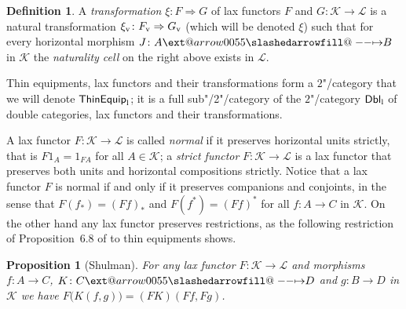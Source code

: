 \documentclass[preprint, a4paper]{elsarticle}
\makeatletter
\def\slashedarrowfill@#1#2#3#4#5{%
  $\m@th\thickmuskip0mu\medmuskip\thickmuskip\thinmuskip\thickmuskip
   \relax#5#1\mkern-7mu%
   \cleaders\hbox{$#5\mkern-2mu#2\mkern-2mu$}\hfill
   \mathclap{#3}\mathclap{#2}%
   \cleaders\hbox{$#5\mkern-2mu#2\mkern-2mu$}\hfill
   \mkern-7mu#4$%
}
\def\rightslashedarrowfill@{%
  \slashedarrowfill@\relbar\relbar\mapstochar\rightarrow}
\newcommand\xslashedrightarrow[2][]{%
  \ext@arrow 0055{\rightslashedarrowfill@}{#1}{#2}}
\def\slashedrightarrow{\xslashedrightarrow{}}
\newtheorem{proposition}[theorem]{Proposition}
\theoremstyle{definition}
\newtheorem{definition}[theorem]{Definition}
\theoremstyle{remark}
\providecommand{\bigpars}[1]{\bigl(#1\bigr)}
\providecommand{\natarrow}{\Rightarrow}
\providecommand{\map}[3]{#1\colon#2\to#3}
\providecommand{\nat}[3]{#1\colon#2\natarrow#3}
\providecommand{\hmap}[3]{#1\colon#2\slashedrightarrow#3}
\providecommand{\catvar}[1]{\mathcal{#1}}
\providecommand{\Dbl}{\mathsf{Dbl}}
\providecommand{\2}{\mathsf 2}
\providecommand{\K}{\catvar K}
\providecommand{\Dbl}{\mathsf{Dbl}}
\providecommand{\lDbl}{\Dbl_\textup l}
\providecommand{\ThinEq}{\mathsf{ThinEquip}}
\providecommand{\lThinEq}{\ThinEq_\textup l}
\makeatother
\begin{document}
\begin{definition}
  	A \emph{transformation} $\nat\xi FG$ of lax functors $F$ and $\map G\K\mathcal L$ is a natural transformation $\nat{\xi_\textup v}{F_\textup v}{G_\textup v}$ (which will be denoted $\xi$) such that for every horizontal morphism $\hmap JAB$ in $\K$ the \emph{naturality cell} on the right above exists in $\mathcal L$.
  \end{definition}
  
  Thin equipments, lax functors and their transformations form a $2$"/category that we will denote $\lThinEq$; it is a full sub"/2"/category of the $2$"/category $\lDbl$ of double categories, lax functors and their transformations.
  
  A lax functor $\map F\K\mathcal L$ is called \emph{normal} if it preserves horizontal units strictly, that is $F1_A = 1_{FA}$ for all $A \in \K$; a \emph{strict functor} $\map F\K\mathcal L$ is a lax functor that preserves both units and horizontal compositions strictly. Notice that a lax functor $F$ is normal if and only if it preserves companions and conjoints, in the sense that $F(f_*) = (Ff)_*$ and $F(f^*) = (Ff)^*$ for all $\map fAC$ in $\K$. On the other hand any lax functor preserves restrictions, as the following restriction of Proposition~6.8 of \cite{Shulman08} to thin equipments shows.
  \begin{proposition}[Shulman] \label{lax functors preserve restrictions}
  	For any lax functor $\map F\K\mathcal L$ and morphisms $\map fAC$, $\hmap KCD$ and $\map gBD$ in $\K$ we have $F\bigpars{K(f, g)} = (FK)(Ff, Fg)$.
  \end{proposition}
\end{document}
